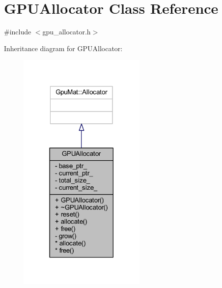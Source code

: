 \hypertarget{class_g_p_u_allocator}{}\section{G\+P\+U\+Allocator Class Reference}
\label{class_g_p_u_allocator}


{\ttfamily \#include $<$gpu\+\_\+allocator.\+h$>$}



Inheritance diagram for G\+P\+U\+Allocator\+:\nopagebreak
\begin{figure}[H]
\begin{center}
\leavevmode
\includegraphics[width=177pt]{class_g_p_u_allocator__inherit__graph}
\end{center}
\end{figure}


